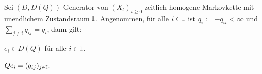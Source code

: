 \documentclass[a4paper]{paper}
\numberwithin{equation}{satz}
\begin{document}
\begin{comment}
\begin{lem}
  Sei $(x_n)_{n\in\N}$ eine punktweise konvergente Folge von Verteilungen in $\ell^1$ mit Grenzwert $x=(\xi_i)_{i\in\I}$. Ist $x$ ebenfalls Verteilung, dann gilt bereits Normkonvergenz.
\end{lem}

\begin{proof}
Sei $A_n= \{i\in \I; \xi_i\geq \xi_{n,i}\}$. Es gilt 
\begin{align*}
\sum_{i\in\I}|\xi_{n,i}-\xi_i|
&=\sum_{i\in A_n}|\xi_{n,i}-\xi_i|+\sum_{i\not\in A_n}(\xi_{n,i}-\xi_i)\\
&=\sum_{i\in A_n}|\xi_{n,i}-\xi_i|  +\sum_{i\in A_n}(\xi_i -\xi_{n,i})\\
&= 2\sum_{i\in A_n}|\xi_{n,i}-\xi_i|\\
&=\sum_{i\in\I}\eta_{n,i},
\end{align*}
wobei $\eta_{n,i}=2|\xi_{n,i}-\xi_i|$ für $i\in A_n$ und $0$ sonst. Dann folgt die Aussage mit dem \textsc{Satz von der dominierten Konvergenz} wegen $\eta_{n,i}\leq 2\xi_i$ für alle $n\geq1 $ und $i\in \I$.
\end{proof}

\end{comment}
\begin{prop}
  Sei $(D,D(Q))$ Generator von $(X_t)_{t\geq0}$ zeitlich homogene Markovkette mit  unendlichem Zustandsraum $\mathbb{I}$. Angenommen, für alle $i\in\mathbb{I}$ ist $q_i:=-q_{ii}< \infty$ und  $\sum_{j\neq i}q_{ij}=q_i$, dann gilt:
  \begin{compactenum}
    \item $e_i\in D(Q)$ für alle $i\in\mathbb{I}$.
    \item $Qe_i= (q_{ij})_{j\in\mathbb{I}}$. 
  \end{compactenum}
\end{prop}

\begin{comment}
\begin{proof}
Sei $q_i=0$. Dann ist $P(t)e_i$ die $i$-te Zeile der Matrix $P(t)$ und es gilt  $$\|\frac{1}{t}(P(t)e_i-e_i)\|=\frac{1}{t}\sum_{j\neq i}p_{ij}(t)+\frac{1}{t}[1-p_{ii}(t)]=\frac{2}{t}[1-p_{ii}(t)]\to 2q_i=0,$$ d.h. $\lim_{t\downarrow 0}\frac{1}{t}(P(t)e_i-e_i)=0=(q_{ij})_{j\in\I}$. Für $q_i>0$ sei $v_i(t)$ Vektor mit $0$ in der $i$-ten Koordinate und für alle $j\neq i$ mit Einträgen $\frac{1}{t}p_{ij}(t)$ Zeige, dass $v_i(t)$ gegen die $i$-te Reihe der Matrix $(q_{ij})_{i,j\in\I}$ konvergiert, wobei hier das $i$-te Element $0$ sei. Schreibe hierfür $v_i$
\end{proof}
\end{comment}
\end{document}
